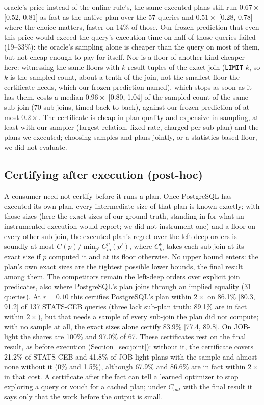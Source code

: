 \documentclass[sigconf, nonacm]{acmart}
\begin{document}
oracle's price instead of the online rule's, the same executed plans still run
$0.67\times$ [0.52, 0.81] as fast as the native plan over the 57 queries and
$0.51\times$ [0.28, 0.78] where the choice matters, faster on 14\% of those.
Our frozen prediction that even this price would exceed the query's execution
time on half of those queries failed (19--33\%): the oracle's sampling alone is
cheaper than the query on most of them, but not cheap enough to pay for
itself. Nor is a floor of another kind cheaper here: witnessing the same floors
with $k$ result tuples of the exact join (\texttt{LIMIT} $k$, so $k$ is the
sampled count, about a tenth of the join, not the smallest floor the
certificate needs, which our frozen prediction named), which stops as soon as it
has them, costs a median $0.96\times$ [0.80, 1.04] of the sampled count of the
same sub-join (70 sub-joins, timed back to back), against our frozen prediction
of at most $0.2\times$. The certificate is cheap in plan quality and expensive in
sampling, at least with our sampler (largest relation, fixed rate, charged per
sub-plan) and the plans we executed; choosing samples and plans jointly, or a
statistics-based floor, we did not evaluate.

\subsection{Certifying after execution (post-hoc)}
A consumer need not certify before it runs a plan. Once PostgreSQL has executed
its own plan, every intermediate size of that plan is known exactly; with those
sizes (here the exact sizes of our ground truth, standing in for what an
instrumented execution would report; we did not instrument one) and a floor on every other sub-join, the executed plan's regret over
the left-deep orders is soundly at most $C(p)/\min_{p'}C^{p}_{lo}(p')$, where
$C^{p}_{lo}$ takes each sub-join at its exact size if $p$ computed it and at its
floor otherwise. No upper bound enters: the plan's own exact sizes are the
tightest possible lower bounds, the final result among them. The competitors
remain the left-deep orders over explicit join predicates, also where
PostgreSQL's plan joins through an implied equality (31 queries). At $r{=}0.10$ this
certifies PostgreSQL's plan within $2\times$ on 86.1\% [80.3, 91.2] of 137
STATS-CEB queries (three lack sub-plan truth; 89.1\% are in fact within
$2\times$), but that needs a sample of every sub-join the plan did not compute;
with no sample at all, the exact sizes alone certify 83.9\% [77.4, 89.8]. On
JOB-light the shares are 100\% and 97.0\% of 67. These certificates rest on the
final result, as before execution (Section~\ref{sec:joint}): without it, the
certificate covers 21.2\% of STATS-CEB and 41.8\% of JOB-light plans with the
sample and almost none without it (0\% and 1.5\%), although 67.9\% and 86.6\%
are in fact within $2\times$ in that cost. A certificate after the fact can tell
a learned optimizer to stop exploring a query or vouch for a cached plan; under
$C_{out}$ with the final result it says only that the work before the output is
small.
\end{document}

